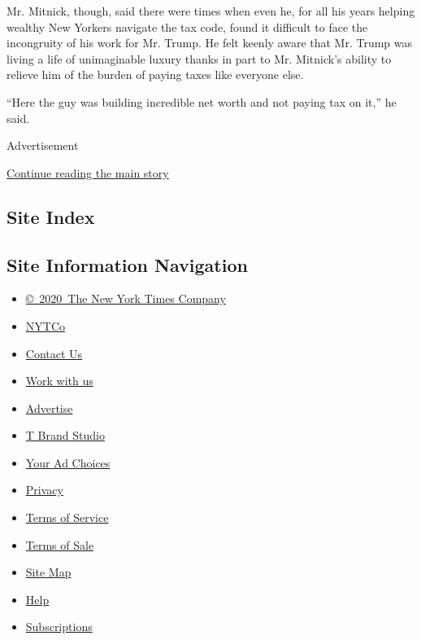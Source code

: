 Mr. Mitnick, though, said there were times when even he, for all his
years helping wealthy New Yorkers navigate the tax code, found it
difficult to face the incongruity of his work for Mr. Trump. He felt
keenly aware that Mr. Trump was living a life of unimaginable luxury
thanks in part to Mr. Mitnick's ability to relieve him of the burden of
paying taxes like everyone else.

``Here the guy was building incredible net worth and not paying tax on
it,'' he said.

Advertisement

\protect\hyperlink{after-bottom}{Continue reading the main story}

\hypertarget{site-index}{%
\subsection{Site Index}\label{site-index}}

\hypertarget{site-information-navigation}{%
\subsection{Site Information
Navigation}\label{site-information-navigation}}

\begin{itemize}
\tightlist
\item
  \href{https://help.nytimes.com/hc/en-us/articles/115014792127-Copyright-notice}{©~2020~The
  New York Times Company}
\end{itemize}

\begin{itemize}
\tightlist
\item
  \href{https://www.nytco.com/}{NYTCo}
\item
  \href{https://help.nytimes.com/hc/en-us/articles/115015385887-Contact-Us}{Contact
  Us}
\item
  \href{https://www.nytco.com/careers/}{Work with us}
\item
  \href{https://nytmediakit.com/}{Advertise}
\item
  \href{http://www.tbrandstudio.com/}{T Brand Studio}
\item
  \href{https://www.nytimes.com/privacy/cookie-policy\#how-do-i-manage-trackers}{Your
  Ad Choices}
\item
  \href{https://www.nytimes.com/privacy}{Privacy}
\item
  \href{https://help.nytimes.com/hc/en-us/articles/115014893428-Terms-of-service}{Terms
  of Service}
\item
  \href{https://help.nytimes.com/hc/en-us/articles/115014893968-Terms-of-sale}{Terms
  of Sale}
\item
  \href{https://spiderbites.nytimes.com}{Site Map}
\item
  \href{https://help.nytimes.com/hc/en-us}{Help}
\item
  \href{https://www.nytimes.com/subscription?campaignId=37WXW}{Subscriptions}
\end{itemize}
